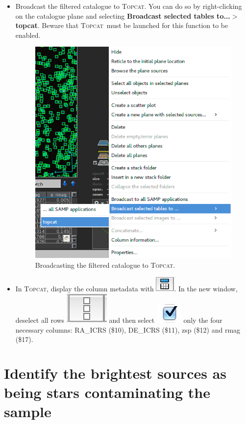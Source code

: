 \documentclass [a4paper, 12pt]{article}
\newcommand{\topcat}{{\textsc{Topcat}}}
\begin{document}
\begin{itemize}
\item Broadcast the filtered catalogue to \topcat. You can do so by 
right-clicking on the catalogue plane and selecting \textbf{Broadcast selected 
tables to...$>$ topcat}. Beware that \topcat\ must be launched for this 
function to be enabled.  

\begin{figure}[H]
\center
\includegraphics[width=0.4 \textwidth]{../images/aladin_send_table_topcat.png}
\caption{Broadcasting the filtered catalogue to \topcat.}
\label{fig:topcatbroadcast}
\end{figure}

\item In \topcat, display the column metadata with \includegraphics[width=0.04  
\textwidth]{../images/topcat_button_metadata.jpg}. In the new window, deselect 
all rows    
\includegraphics[width=0.04  \textwidth]{../images/topcat_button_invisible.jpg} 
and then select  \includegraphics[width=0.04  
\textwidth]{../images/topcat_button_select.jpg} 
only the four necessary columns: RA\_ICRS (\$10), DE\_ICRS (\$11), zsp (\$12) 
and rmag (\$17).
\end{itemize}

\section{Identify the brightest sources as being stars contaminating the sample}
\end{document}
